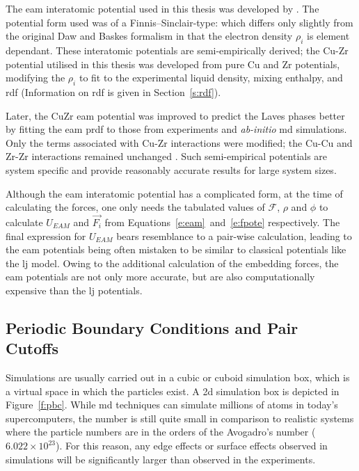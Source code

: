 The \gls{eam} interatomic potential used in this thesis was developed by \textcite{Mendelev2009,Mendelev2019}. The potential form used was of a Finnis–Sinclair-type: which differs only slightly from the original Daw and Baskes \cite{Daw1983,Daw1993} formalism in that the electron density $\rho_{i}$ is element dependant. These interatomic potentials are semi-empirically derived; the Cu-Zr potential utilised in this thesis \cite{Mendelev2019} was developed from pure Cu and Zr potentials, modifying the $\rho_{i}$ to fit to the experimental liquid density, mixing enthalpy, and \gls{rdf} \cite{Mendelev2009} (Information on \gls{rdf} is given in Section~\ref{s:rdf}). \par 

Later, the CuZr \gls{eam} potential was improved to predict the Laves phases better by fitting the  \gls{eam} \gls{prdf} to those from experiments and \textit{ab-initio} \gls{md} simulations. Only the terms associated with Cu-Zr interactions were modified; the Cu-Cu and Zr-Zr interactions remained unchanged \cite{Mendelev2019}. Such semi-empirical potentials are system specific and provide reasonably accurate results for large system sizes. \par 

Although the \gls{eam} interatomic potential has a complicated form, at the time of calculating the forces, one only needs the tabulated values of $\mathcal{F}$, $\rho$ and $\phi$ to calculate $U_{EAM}$ and $\vec{F_i}$ from Equations~\ref{e:eam}~and~\ref{e:fpote} respectively. The final expression for $U_{EAM}$ bears resemblance to a pair-wise calculation, leading to the \gls{eam} potentials being often mistaken to be similar to classical potentials like the \gls{lj} model. Owing to the additional calculation of the embedding forces, the \gls{eam} potentials are not only more accurate, but are also computationally expensive than the \gls{lj} potentials. \par

\subsection{Periodic Boundary Conditions and Pair Cutoffs}
Simulations are usually carried out in a cubic or cuboid simulation box, which is a virtual space in which the particles exist. A \gls{2d} simulation box is depicted in Figure~\ref{f:pbc}. While \gls{md} techniques can simulate millions of atoms in today's supercomputers, the number is still quite small in comparison to realistic systems where the particle numbers are in the orders of the Avogadro's number ($6.022 \times 10^{23}$). For this reason, any edge effects or surface effects observed in simulations will be significantly larger than observed in the experiments. \par


